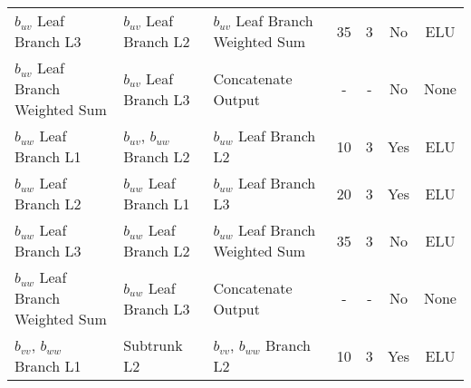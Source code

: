 \documentclass[11pt]{article}
\numberwithin{equation}{section}
\theoremstyle{plain}
\theoremstyle{definition}
\begin{document}
\begin{sidewaystable}[]
{\begin{tabular}{lllcccc}
$b_{uv}$ Leaf Branch L3                      & $b_{uv}$ Leaf Branch L2                                                & $b_{uv}$ Leaf Branch Weighted Sum                                       & 35                                     & 3                                            & No                                       & ELU                                      \\ 
$b_{uv}$ Leaf Branch Weighted Sum                 & $b_{uv}$ Leaf Branch L3                                                & Concatenate Output                                              & -                                      & -                                            & No                                       & None                                     \\ \midrule
$b_{uw}$ Leaf Branch L1                      & $b_{uv}$, $b_{uw}$ Branch L2                                         & $b_{uw}$ Leaf Branch L2                                            & 10                                     & 3                                            & Yes                                      & ELU                                      \\ 
$b_{uw}$ Leaf Branch L2                      & $b_{uw}$ Leaf Branch L1                                                & $b_{uw}$ Leaf Branch L3                                            & 20                                     & 3                                            & Yes                                      & ELU                                      \\ 
$b_{uw}$ Leaf Branch L3                      & $b_{uw}$ Leaf Branch L2                                                & $b_{uw}$ Leaf Branch Weighted Sum                                               & 35                                     & 3                                            & No                                       & ELU                                      \\ 
$b_{uw}$ Leaf Branch Weighted Sum                 & $b_{uw}$ Leaf Branch L3                                                & Concatenate Output                                              & -                                      & -                                            & No                                       & None                                     \\ \midrule
$b_{vv}$, $b_{ww}$ Branch L1               & Subtrunk L2                           & $b_{vv}$, $b_{ww}$ Branch L2                                     & 10                                     & 3                                            & Yes                                      & ELU                                      \\ 

\end{tabular}}
\end{sidewaystable}
\end{document}
